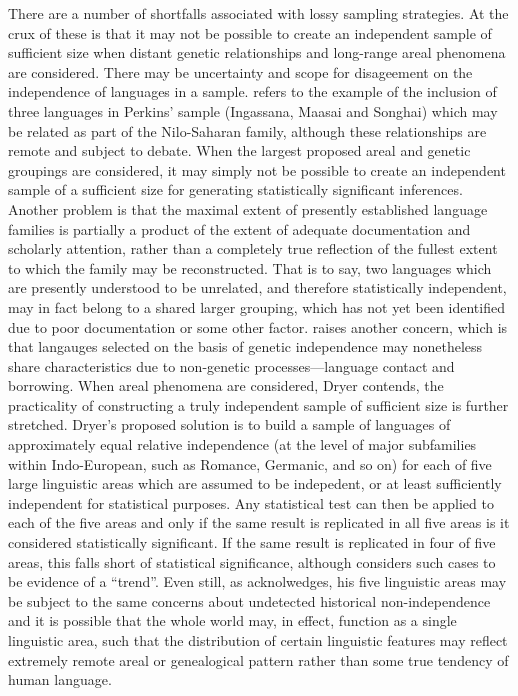 There are a number of shortfalls associated with lossy sampling strategies. At the crux of these is that it may not be possible to create an independent sample of sufficient size when distant genetic relationships and long-range areal phenomena are considered. There may be uncertainty and scope for disageement on the independence of languages in a sample. \textcite[p.~261]{dryer_large_1989} refers to the example of the inclusion of three languages in Perkins' sample (Ingassana, Maasai and Songhai) which may be related as part of the Nilo-Saharan family, although these relationships are remote and subject to debate. When the largest proposed areal and genetic groupings are considered, it may simply not be possible to create an independent sample of a sufficient size for generating statistically significant inferences. Another problem is that the maximal extent of presently established language families is partially a product of the extent of adequate documentation and scholarly attention, rather than a completely true reflection of the fullest extent to which the family may be reconstructed. That is to say, two languages which are presently understood to be unrelated, and therefore statistically independent, may in fact belong to a shared larger grouping, which has not yet been identified due to poor documentation or some other factor. \textcite[p.~263]{dryer_large_1989} raises another concern, which is that langauges selected on the basis of genetic independence may nonetheless share characteristics due to non-genetic processes---language contact and borrowing. When areal phenomena are considered, Dryer contends, the practicality of constructing a truly independent sample of sufficient size is further stretched. Dryer's proposed solution is to build a sample of languages of approximately equal relative independence (at the level of major subfamilies within Indo-European, such as Romance, Germanic, and so on) for each of five large linguistic areas which are assumed to be indepedent, or at least sufficiently independent for statistical purposes. Any statistical test can then be applied to each of the five areas and only if the same result is replicated in all five areas is it considered statistically significant. If the same result is replicated in four of five areas, this falls short of statistical significance, although \textcite[pp.~272--273]{dryer_large_1989} considers such cases to be evidence of a ``trend''. Even still, as \textcite[p.~284]{dryer_large_1989} acknolwedges, his five linguistic areas may be subject to the same concerns about undetected historical non-independence and it is possible that the whole world may, in effect, function as a single linguistic area, such that the distribution of certain linguistic features may reflect extremely remote areal or genealogical pattern rather than some true tendency of human language.


